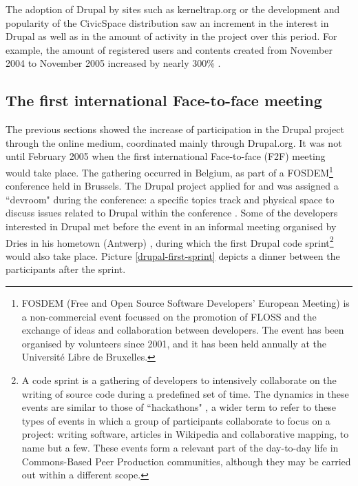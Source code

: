 The adoption of Drupal by sites such as kerneltrap.org or the development and popularity of the CivicSpace distribution saw an increment in the interest in Drupal as well as in the amount of activity in the project over this period. For example, the amount of registered users and contents created from November 2004 to November 2005 increased by nearly 300\% \parencite{drupal-growth:2017:Online}.

\subsection{The first international Face-to-face meeting}
\label{subsec:offline-side}

The previous sections showed the increase of participation in the Drupal project through the online medium, coordinated mainly through Drupal.org. It was not until February 2005 when the first international Face-to-face (F2F) meeting would take place. The gathering occurred in Belgium, as part of a FOSDEM\footnote{FOSDEM (Free and Open Source Software Developers' European Meeting) is a non-commercial event focussed on the promotion of FLOSS and the exchange of ideas and collaboration between developers. The event has been organised by volunteers since 2001, and it has been held annually at the Universit\'e Libre de Bruxelles.} conference held in Brussels. The Drupal project applied for and was assigned a ``devroom" during the conference: a specific topics track and physical space to discuss issues related to Drupal within the conference \parencite{drupal-fosdem2005:2013:Online}. Some of the developers interested in Drupal met before the event in an informal meeting organised by Dries in his hometown (Antwerp) \parencite{benjamin2011definitive}, during which the first Drupal code sprint\footnote{A code sprint is a gathering of developers to intensively collaborate on the writing of source code during a predefined set of time. The dynamics in these events are similar to those of ``hackathons" \parencite{lapp20072006}, a wider term to refer to these types of events in which a group of participants collaborate to focus on a project: writing software, articles in Wikipedia and collaborative mapping, to name but a few. These events form a relevant part of the day-to-day life in Commons-Based Peer Production communities, although they may be carried out within a different scope.} would also take place. Picture \ref{drupal-first-sprint} depicts a dinner between the participants after the sprint.


